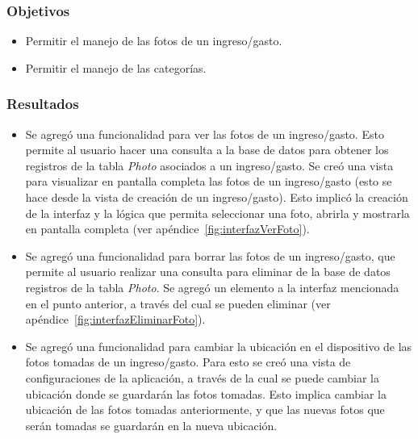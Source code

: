 \subsubsection{Objetivos}
\begin{itemize}
\item Permitir el manejo de las fotos de un ingreso/gasto.
\item Permitir el manejo de las categorías.
\end{itemize}

\subsubsection{Resultados}
\begin{itemize}
\item Se agregó una funcionalidad para ver las fotos de un ingreso/gasto. Esto permite al usuario hacer una consulta a la base de datos para obtener los registros de la tabla \textit{Photo} asociados a un ingreso/gasto. Se creó una vista para visualizar en pantalla completa las fotos de un ingreso/gasto (esto se hace desde la vista de creación de un ingreso/gasto). Esto implicó la creación de la interfaz y la lógica que permita seleccionar una foto, abrirla y mostrarla en pantalla completa (ver apéndice~\ref{fig:interfazVerFoto}).
\item Se agregó una funcionalidad para borrar las fotos de un ingreso/gasto, que permite al usuario realizar una consulta para eliminar de la base de datos registros de la tabla \textit{Photo}. Se agregó un elemento a la interfaz mencionada en el punto anterior, a través del cual se pueden eliminar (ver apéndice~\ref{fig:interfazEliminarFoto}).
\item Se agregó una funcionalidad para cambiar la ubicación en el dispositivo de las fotos tomadas de un ingreso/gasto. Para esto se creó una vista de configuraciones de la aplicación, a través de la cual se puede cambiar la ubicación donde se guardarán las fotos tomadas. Esto implica cambiar la ubicación de las fotos tomadas anteriormente, y que las nuevas fotos que serán tomadas se guardarán en la nueva ubicación.


\end{itemize}
